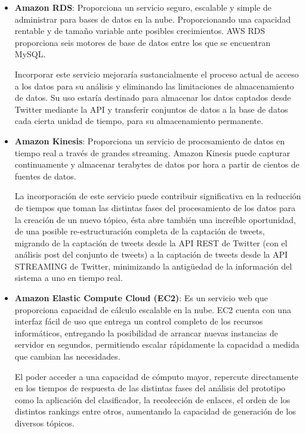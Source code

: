 	\begin{itemize}
		\item \textbf{Amazon RDS}: Proporciona un servicio seguro, escalable y simple de administrar para bases de datos en la nube. Proporcionando una capacidad rentable y de tamaño variable ante posibles crecimientos. AWS RDS proporciona seis motores de base de datos entre los que se encuentran MySQL.
		
		Incorporar este servicio mejoraría sustancialmente el proceso actual de acceso a los datos para su análisis y eliminando las limitaciones de almacenamiento de datos. Su uso estaría destinado para almacenar los datos captados desde Twitter mediante la API y transferir conjuntos de datos a la base de datos cada cierta unidad de tiempo, para su almacenamiento permanente.
		
		\item \textbf{Amazon Kinesis}: Proporciona un servicio de procesamiento de datos en tiempo real a través de grandes streaming. Amazon Kinesis puede capturar continuamente y almacenar terabytes de datos por hora a partir de cientos de fuentes de datos.
		
		La incorporación de este servicio puede contribuir significativa en la reducción de tiempos que toman las distintas fases del procesamiento de los datos para la creación de un nuevo tópico, ésta abre también una increíble oportunidad, de una posible re-estructuración completa de la captación de tweets, migrando de la captación de tweets desde la API REST de Twitter (con el análisis post del conjunto de tweets) a la captación de tweets desde la API STREAMING de Twitter, minimizando la antigüedad de la información del sistema a uno en tiempo real.
		
		\item \textbf{Amazon Elastic Compute Cloud (EC2)}: Es un servicio web que proporciona capacidad de cálculo escalable en la nube. EC2 cuenta con una interfaz fácil de uso que entrega un control completo de los recursos informáticos, entregando la posibilidad de arrancar nuevas instancias de servidor en segundos, permitiendo escalar rápidamente la capacidad a medida que cambian las necesidades.
		
		El poder acceder a una capacidad de cómputo mayor, repercute directamente en los tiempos de respuesta de las distintas fases del análisis del prototipo como la aplicación del clasificador, la recolección de enlaces, el orden de los distintos rankings entre otros, aumentando la capacidad de generación de los diversos tópicos.
		
	\end{itemize}
	
